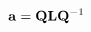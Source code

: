 \vspace{-0.1cm}
\begin{equation}
    \mathbf{a} = \mathbf{Q} \mathbf{L} \mathbf{Q}^{-1}
    \label{eq:forward-pass}
    \vspace{-0.05cm}
\end{equation}